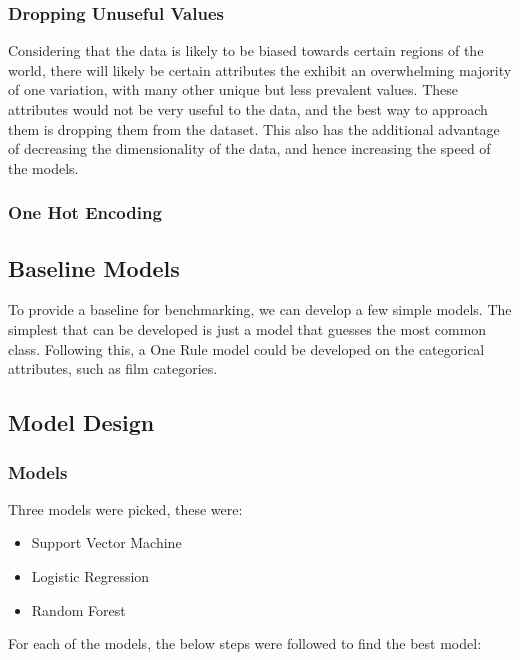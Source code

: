 \documentclass[11pt]{article}
\begin{document}
\subsubsection{Dropping Unuseful Values}
Considering that the data is likely to be biased towards certain regions of the world, there will likely be certain attributes the exhibit an overwhelming majority of one variation, with many other unique but less prevalent values. These attributes would not be very useful to the data, and the best way to approach them is dropping them from the dataset. This also has the additional advantage of decreasing the dimensionality of the data, and hence increasing the speed of the models.

\subsubsection{One Hot Encoding}

\subsection{Baseline Models}
To provide a baseline for benchmarking, we can develop a few simple models. The simplest that can be developed is just a model that guesses the most common class. Following this, a One Rule model could be developed on the categorical attributes, such as film categories.

\subsection{Model Design}
\subsubsection{Models}

Three models were picked, these were:

\begin{itemize}
    \item Support Vector Machine
    \item Logistic Regression
    \item Random Forest
\end{itemize}

For each of the models, the below steps were followed to find the best model:
\end{document}
